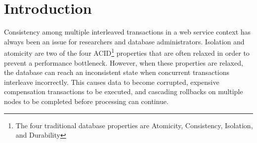 \chapter{Introduction}\label{chap:intro}

Consistency among multiple interleaved transactions in a web service context has always been an issue for researchers and database administrators. Isolation and atomicity are two of the four ACID\footnote{The four traditional database properties are Atomicity, Consistency, Isolation, and Durability} properties that are often relaxed in order to prevent a performance bottleneck. However, when these properties are relaxed, the database can reach an inconsistent state when concurrent transactions interleave incorrectly. This causes data to become corrupted, expensive compensation transactions to be executed, and cascading rollbacks on multiple nodes to be completed before processing can continue. 




